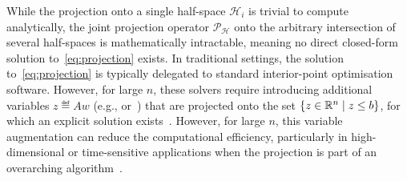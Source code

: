 While the projection onto a single half-space $\mathcal{H}_i$ is trivial to compute analytically, the joint projection operator $\mathcal{P}_{\mathcal{H}}$ onto the arbitrary intersection of several half-spaces is mathematically intractable, meaning no direct closed-form solution to~\eqref{eq:projection} exists. In traditional settings, the solution to~\eqref{eq:projection} is typically delegated to standard interior-point optimisation software. However, for large $n$, these solvers require introducing additional variables $z\eqdef Aw$ (e.g., \cite{osqp} or~\cite{ocpb:16}) that are projected onto the set $\left\{ z\in\mathbb{R}^n \;\middle|\; z \leq b \right\}$, for which an explicit solution exists~\cite{BOYDCONVEX}. However, for large $n$, this variable augmentation can reduce the computational efficiency, particularly in high-dimensional or time-sensitive applications when the projection is part of an overarching algorithm~\cite{OPTIMNESTEROV,KEMPF20206542}.